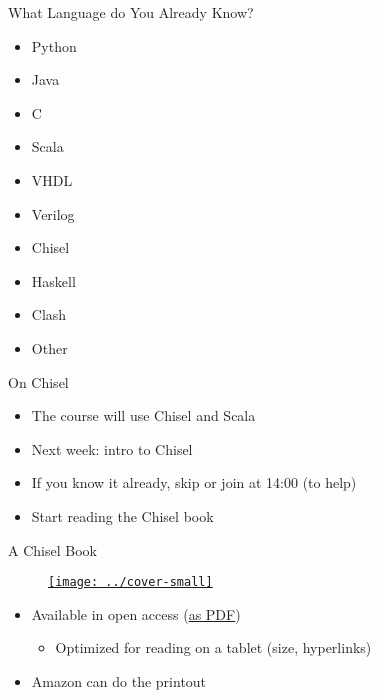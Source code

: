 \begin{frame}[fragile]{What Language do You Already Know?}
\begin{itemize}
\item Python
\item Java
\item C
\item Scala
\item VHDL
\item Verilog
\item Chisel
\item Haskell
\item Clash
\item Other
\end{itemize}
\end{frame}

\begin{frame}[fragile]{On Chisel}
\begin{itemize}
\item The course will use Chisel and Scala
\item Next week: intro to Chisel
\item If you know it already, skip or join at 14:00 (to help)
\item Start reading the Chisel book
\end{itemize}
\end{frame}

\begin{frame}[fragile]{A Chisel Book}
\begin{figure}
    \centering
    \href{https://github.com/schoeberl/chisel-book}{\texttt{[image: ../cover-small]}}
\end{figure}

\begin{itemize}
\item Available in open access (\href{https://www.imm.dtu.dk/~masca/chisel-book.pdf}{as PDF})
\begin{itemize}
\item Optimized for reading on a tablet (size, hyperlinks)
\end{itemize}
\item Amazon can do the printout
\end{itemize}
\end{frame}

